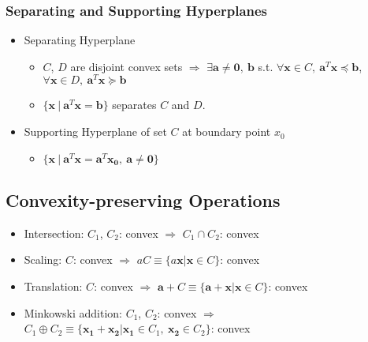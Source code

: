 \subsubsection*{Separating and Supporting Hyperplanes}
\begin{itemize}
    \item Separating Hyperplane
    \begin{itemize}
        \item $C$, $D$ are disjoint convex sets $\Rightarrow$ 
            $\exists \mathbf{a} \neq \mathbf{0},~\mathbf{b}$ s.t. 
            $\forall \mathbf{x} \in C,~\mathbf{a}^T\mathbf{x} \preceq \mathbf{b}$,
            $\forall \mathbf{x} \in D,~\mathbf{a}^T\mathbf{x} \succeq \mathbf{b}$
        \item $\{\mathbf{x}~|~\mathbf{a}^T\mathbf{x} = \mathbf{b}\}$ separates $C$ and $D$.
    \end{itemize}
    \item Supporting Hyperplane of set $C$ at boundary point $x_0$
    \begin{itemize}
        \item $\{\mathbf{x}~|~\mathbf{a}^T\mathbf{x} = \mathbf{a}^T\mathbf{x_0},~\mathbf{a}\neq\mathbf{0}\}$
    \end{itemize}
\end{itemize}

\subsection{Convexity-preserving Operations}
\begin{itemize}
    \item Intersection: $C_1$, $C_2$: convex $\Rightarrow$ $C_1 \cap C_2$: convex
    \item Scaling: $C$: convex $\Rightarrow$ $aC \equiv \{a\mathbf{x}|\mathbf{x} \in C\}$: convex
    \item Translation: $C$: convex $\Rightarrow$ $\mathbf{a} + C \equiv \{\mathbf{a}+\mathbf{x}|\mathbf{x}\in C\}$: convex
    \item Minkowski addition: $C_1$, $C_2$: convex $\Rightarrow$ $C_1 \oplus C_2 \equiv \{\mathbf{x_1}+\mathbf{x_2}|\mathbf{x_1}\in C_1,~\mathbf{x_2}\in C_2\}$: convex
\end{itemize}

